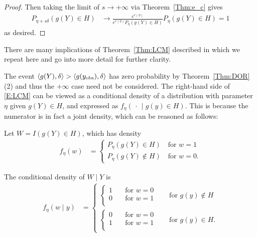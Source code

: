 \begin{proof}
Then taking the limit of $s \to +\infty$ via Theorem~\ref{Thm:e_c} gives
\begin{align*}
 P_{\eta+s\delta}(g(Y) \in H)
		&\to \frac{e^{c(\eta)}}{ e^{c(\eta)} P_\eta (g(Y) \in H) } P_\eta (g(Y)\in H) = 1
 \end{align*}
 as desired.   
\end{proof}


There are many implications of Theorem~\ref{Thm:LCM} described in \citep{Geyer:gdor}
which we repeat here and go into more detail for further clarity.

The event $\langle g(Y),\delta \rangle > \langle g(y_{\text{obs}}),\delta \rangle$ has zero probability by 
Theorem~\ref{Thm:DOR}(2) and thus the $+\infty$ case need not be considered.
The right-hand side of \eqref{E:LCM} can be viewed as a conditional density of a 
distribution with parameter $\eta$ given $g(Y) \in H$, and expressed as $f_{\eta}
(\, \cdot\,  \mid g(y) \in H)$.  This is because the numerator
is in fact a joint density, which can be reasoned as follows:

Let $W = I(g(Y) \in H)$, which has density 
\begin{align*}
	f_\eta(w) &= \begin{cases}
					P_\eta(g(Y) \in H) \quad \text{for $w=1$} \\
					P_\eta(g(Y) \notin H) \quad \text{for $w=0$}.
				\end{cases}
\end{align*}

The conditional density of $W \mid Y$ is
\begin{align*}
	f_\eta(w \mid y) &= \begin{cases}
 			\begin{cases}
			1 	\quad &\text{for $w=0$}\\
			0 	\quad &\text{for $w=1$}\\
			\end{cases} \quad &\text{for } g(y) \notin H\\
 			\begin{cases}
			0 	\quad &\text{for $w=0$}\\
			1 	\quad &\text{for $w=1$}\\
			\end{cases} \quad &\text{for } g(y) \in H.
 		\end{cases}
\end{align*}

